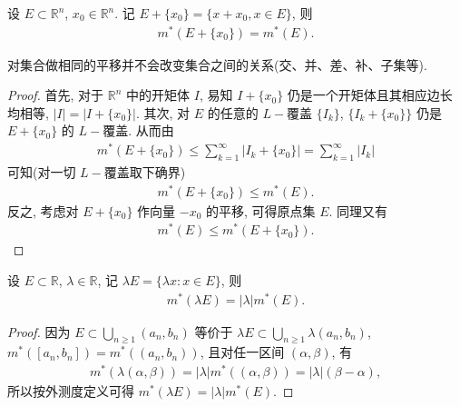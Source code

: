 \documentclass[../../main.tex]{subfiles}
\begin{document}
\begin{theorem}[外测度的平移不变性]\label{theorem:外测度的平移不变性}
设 \(E \subset \mathbb{R}^n\), \(x_0 \in \mathbb{R}^n\). 记 \(E + \{x_0\} = \{x + x_0, x \in E\}\), 则
\begin{align}
m^*(E + \{x_0\}) = m^*(E). \label{eq:2.1}
\end{align}
\end{theorem}
\begin{remark}
对集合做相同的平移并不会改变集合之间的关系(交、并、差、补、子集等).
\end{remark}
\begin{proof}
首先, 对于 \(\mathbb{R}^n\) 中的开矩体 \(I\), 易知 \(I + \{x_0\}\) 仍是一个开矩体且其相应边长均相等, \(|I| = |I + \{x_0\}|\). 其次, 对 \(E\) 的任意的 \(L -\)覆盖 \(\{I_k\}\), \(\{I_k + \{x_0\}\}\) 仍是 \(E + \{x_0\}\) 的 \(L -\)覆盖. 从而由
\begin{align*}
m^*(E + \{x_0\}) \leq \sum_{k = 1}^{\infty} |I_k + \{x_0\}| = \sum_{k = 1}^{\infty} |I_k|
\end{align*}
可知(对一切 \(L -\)覆盖取下确界)
\begin{align*}
m^*(E + \{x_0\}) \leq m^*(E).
\end{align*}
反之, 考虑对 \(E + \{x_0\}\) 作向量 \(-x_0\) 的平移, 可得原点集 \(E\). 同理又有
\begin{align*}
m^*(E) \leq m^*(E + \{x_0\}).
\end{align*} 
\end{proof}

\begin{theorem}[外测度的数乘]\label{theorem:外测度的数乘}
设 \(E \subset \mathbb{R}\), \(\lambda \in \mathbb{R}\), 记 \(\lambda E = \{ \lambda x : x \in E\}\), 则
\begin{align*}
m^*(\lambda E) = |\lambda| m^*(E).
\end{align*}
\end{theorem}
\begin{proof}
因为 \(E \subset \bigcup_{n \geq 1} (a_n, b_n)\) 等价于 \(\lambda E \subset \bigcup_{n \geq 1} \lambda (a_n, b_n)\), \(m^*([a_n, b_n]) = m^*((a_n, b_n))\), 且对任一区间 \((\alpha, \beta)\), 有
\begin{align*}
m^*(\lambda (\alpha, \beta)) = |\lambda| m^*((\alpha, \beta)) = |\lambda| (\beta - \alpha),
\end{align*}
所以按外测度定义可得 \(m^*(\lambda E) = |\lambda| m^*(E)\). 
\end{proof}
\end{document}
